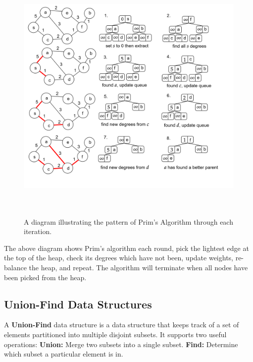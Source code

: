 \begin{figure}[h]
\centering

        




\includegraphics[height=5in]{./Sections/spanning/prims_alg.png}

        \caption{A diagram illustrating the pattern of Prim's Algorithm through each iteration.}
        \label{fig:prim_example}
    \end{figure}



\noindent
The above diagram shows Prim's algorithm each round, pick the lightest edge at the top of the heap, check its degrees which have not been, 
update weights, re-balance the heap, and repeat. The algorithm will terminate when all nodes have been picked from the heap.\\ 

\newpage
\subsection{Union-Find Data Structures}
\begin{Def}

    A \textbf{Union-Find} data structure is a data structure that keeps track of a set of elements partitioned into multiple disjoint subsets. 
    It supports two useful operations: \textbf{Union:} Merge two subsets into a single subset. \textbf{Find:} Determine which subset a particular element is in.
\end{Def}

